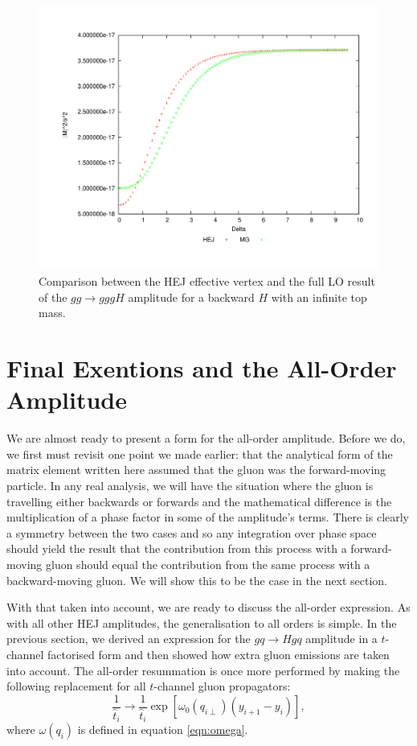 \begin{figure}[t]
\centering
\includegraphics[scale=0.45]{Images/gg_nextback.pdf}
\caption{Comparison between the HEJ effective vertex and the full LO result of the $gg \to gggH$ amplitude for a backward $H$ with an infinite top mass.}
\label{fig:gg_ggh_4}
\end{figure}

\clearpage

\section{Final Exentions and the All-Order Amplitude}
We are almost ready to present a form for the all-order amplitude. Before we do, we first must revisit one point we made earlier: that the analytical form of the matrix element written here assumed that the gluon was the forward-moving particle. In any real analysis, we will have the situation where the gluon is travelling either backwards or forwards and the mathematical difference is the multiplication of a phase factor in some of the amplitude's terms. There is clearly a symmetry between the two cases and so any integration over phase space should yield the result that the contribution from this process with a forward-moving gluon should equal the contribution from the same process with a backward-moving gluon. We will show this to be the case in the next section. 

With that taken into account, we are ready to discuss the all-order expression. As with all other HEJ amplitudes, the generalisation to all orders is simple. In the previous section, we derived an expression for the $gq \to Hgq$ amplitude in a $t$-channel factorised form and then showed how extra gluon emissions are taken into account. The all-order resummation is once more performed by making the following replacement for all $t$-channel gluon propagators:
\begin{equation}
\frac{1}{\hat{t}_i} \to \frac{1}{\hat{t}_i} \exp \left[ \omega_0(q_{i\perp})(y_{i+1} - y_i) \right],
\end{equation}
where $\omega(q_i)$ is defined in equation \ref{eqn:omega}. 


